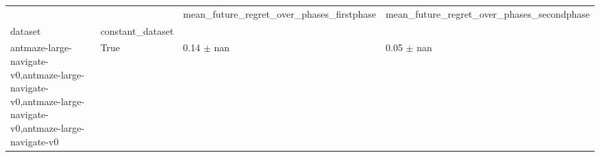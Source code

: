 \begin{tabular}{llll}
\toprule
 &  & mean_future_regret_over_phases_firstphase & mean_future_regret_over_phases_secondphase \\
dataset & constant_dataset &  &  \\
\midrule
antmaze-large-navigate-v0,antmaze-large-navigate-v0,antmaze-large-navigate-v0,antmaze-large-navigate-v0 & True & 0.14 $\pm$ nan & 0.05 $\pm$ nan \\
\cline{1-4}
\bottomrule
\end{tabular}
